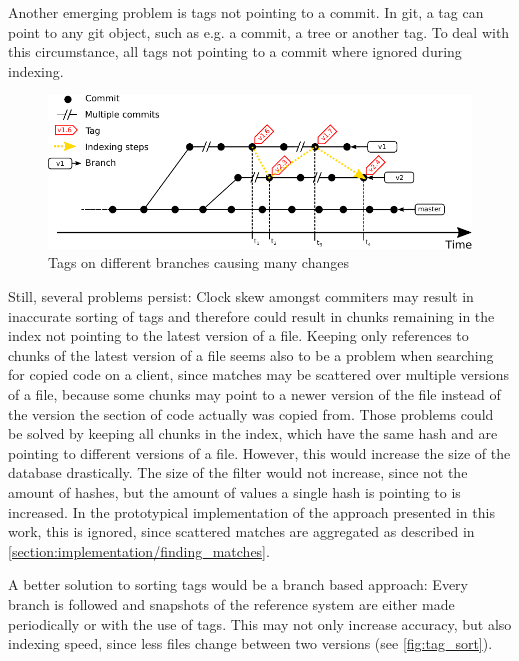 Another emerging problem is tags not pointing to a commit.
In git, a tag can point to any git object, such as e.g. a commit, a tree or another tag.
To deal with this circumstance, all tags not pointing to a commit where ignored during indexing.

\begin{figure}[h]
	\centering
	\includegraphics{figures/tag_sort.pdf}
	\caption{Tags on different branches causing many changes}\label{fig:tag_sort}
\end{figure}

Still, several problems persist: 
Clock skew amongst commiters may result in inaccurate sorting of tags and therefore could result in chunks remaining in the index not pointing to the latest version of a file.
Keeping only references to chunks of the latest version of a file seems also to be a problem when searching for copied code on a client, since matches may be scattered over multiple versions of a file, because some chunks may point to a newer version of the file instead of the version the section of code actually was copied from.
Those problems could be solved by keeping all chunks in the index, which have the same hash and are pointing to different versions of a file.
However, this would increase the size of the database drastically.
The size of the filter would not increase, since not the amount of hashes, but the amount of values a single hash is pointing to is increased.
In the prototypical implementation of the approach presented in this work, this is ignored, since scattered matches are aggregated as described in \autoref{section:implementation/finding_matches}.

A better solution to sorting tags would be a branch based approach:
Every branch is followed and snapshots of the reference system are either made periodically or with the use of tags.
This may not only increase accuracy, but also indexing speed, since less files change between two versions (see \autoref{fig:tag_sort}).

